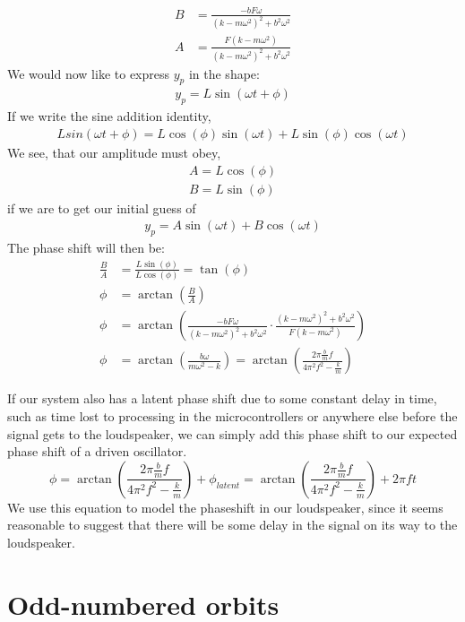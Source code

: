 \documentclass[12pt,oneside,a4paper]{article}
\numberwithin{equation}{section}
\begin{document}
{{\begin{align*}
B &= \frac{-bF\omega}{\left(k-m\omega^2\right)^2+b^2\omega^2}\\
A &=  \frac{F\left(k-m\omega^2\right)}{\left(k-m\omega^2\right)^2+b^2\omega^2}
\end{align*}
We would now like to express $y_p$ in the shape:
\begin{align*}
y_p = L \sin(\omega t + \phi)
\end{align*}
If we write the sine addition identity,
\begin{align*}
L sin(\omega t + \phi) = L\cos(\phi)\sin(\omega t) + L\sin(\phi)\cos(\omega t)
\end{align*}
We see, that our amplitude must obey,
\begin{align*}
A = L\cos(\phi)\\
B = L\sin(\phi)
\end{align*}
if we are to get our initial guess of
\begin{align*}
y_p = A \sin (\omega t) + B \cos(\omega t)
\end{align*}
The phase shift will then be:
\begin{align*}
\frac{B}{A} &= \frac{L\sin(\phi)}{L\cos(\phi)} = \tan(\phi)\\
\phi &= \arctan\left(\frac{B}{A}\right)\\
\phi &= \arctan\left( \frac{-bF\omega}{\left(k-m\omega^2\right)^2+b^2\omega^2} \cdot \frac{\left(k-m\omega^2\right)^2+b^2\omega^2}{F\left(k-m\omega^2\right)} \right)\\
\phi &= \arctan\left( \frac{b\omega}{m\omega^2-k} 
\right)=\arctan\left(\frac{2\pi \frac{b}{m} f}{4\pi^2 
	f^2-\frac{k}{m}}\right)
\end{align*}

If our system also has a latent phase shift due to some constant delay in time, such as time lost to processing in the microcontrollers or anywhere else before the signal gets to the loudspeaker, we can simply add this phase shift to our expected phase shift of a driven oscillator.
\begin{equation}
    \phi = \arctan\left(\frac{2\pi \frac{b}{m} f}{4\pi^2 
    f^2-\frac{k}{m}}\right)+\phi_{latent} =\arctan\left(\frac{2\pi \frac{b}{m} 
    f}{4\pi^2 f^2-\frac{k}{m}}\right) + 2\pi f t
    \label{pshifteq}
\end{equation}
We use this equation to model the phaseshift in our loudspeaker, since it seems 
reasonable to suggest that there will be some delay in the signal on its way to 
the loudspeaker.
\newpage
\section{Odd-numbered orbits}



}}
\end{document}
